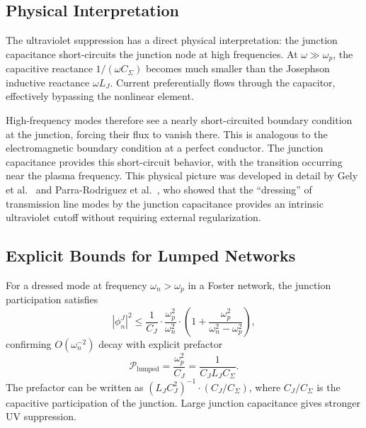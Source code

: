 \documentclass[reprint, floatfix, superscriptaddress, amsmath, amssymb, longbibliography]{revtex4-2}
\begin{document}
\subsection{Physical Interpretation}
\label{sec:physical_interp}

The ultraviolet suppression has a direct physical interpretation: the junction capacitance short-circuits the junction node at high frequencies. At $\omega \gg \omega_p$, the capacitive reactance $1/(\omega C_\Sigma)$ becomes much smaller than the Josephson inductive reactance $\omega L_J$. Current preferentially flows through the capacitor, effectively bypassing the nonlinear element.

High-frequency modes therefore see a nearly short-circuited boundary condition at the junction, forcing their flux to vanish there. This is analogous to the electromagnetic boundary condition at a perfect conductor. The junction capacitance provides this short-circuit behavior, with the transition occurring near the plasma frequency. This physical picture was developed in detail by Gely et al.~\cite{Gely2017} and Parra-Rodriguez et al.~\cite{ParraRodriguez2018}, who showed that the ``dressing'' of transmission line modes by the junction capacitance provides an intrinsic ultraviolet cutoff without requiring external regularization.

\subsection{Explicit Bounds for Lumped Networks}
\label{sec:analytic_bounds_lumped}

For a dressed mode at frequency $\omega_n > \omega_p$ in a Foster network, the junction participation satisfies
\begin{equation}
|\phi_n^J|^2 \leq \frac{1}{C_J} \cdot \frac{\omega_p^2}{\omega_n^2} \cdot \left(1 + \frac{\omega_p^2}{\omega_n^2 - \omega_p^2}\right),
\label{eq:sharp_bound}
\end{equation}
confirming $O(\omega_n^{-2})$ decay with explicit prefactor
\begin{equation}
\mathcal{P}_{\mathrm{lumped}} = \frac{\omega_p^2}{C_J} = \frac{1}{C_J L_J C_\Sigma}.
\label{eq:prefactor_lumped}
\end{equation}
The prefactor can be written as $(L_J C_J^2)^{-1} \cdot (C_J/C_\Sigma)$, where $C_J/C_\Sigma$ is the capacitive participation of the junction. Large junction capacitance gives stronger UV suppression.
\end{document}
